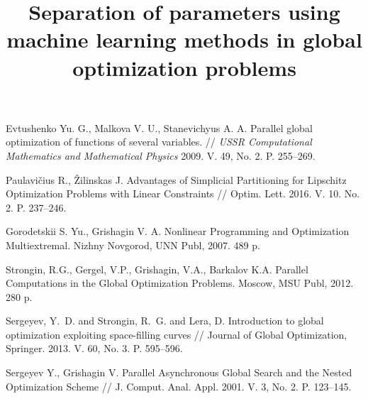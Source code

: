 \documentclass[11pt, oneside, a4paper]{article}
\begin{document}
\newpage

\title{Separation of parameters using machine learning methods in global optimization problems}




\begin{biblioen}

 Evtushenko Yu. G., Malkova V. U., Stanevichyus A. A. Parallel global optimization of functions of several variables. // {\it USSR Computational Mathematics and Mathematical Physics} 2009. V. 49, No. 2. P. 255--269.

 Paulavi{\v c}ius R., {\v Z}ilinskas J. Advantages of Simplicial Partitioning for Lipschitz Optimization Problems with Linear Constraints // Optim. Lett. 2016. V. 10. No. 2. P. 237--246.

 Gorodetskii S. Yu., Grishagin V. A. Nonlinear Programming and Optimization Multiextremal. Nizhny Novgorod, UNN Publ, 2007. 489 p.

 Strongin, R.G., Gergel, V.P., Grishagin, V.A., Barkalov K.A. Parallel Computations in the Global Optimization Problems. Moscow, MSU Publ, 2012. 280 p.

 Sergeyev, Y.~D. and Strongin, R.~G. and Lera, D. Introduction to global optimization exploiting space-filling curves // Journal of Global Optimization, Springer. 2013. V. 60, No. 3. P. 595--596.

 Sergeyev Y., Grishagin V. Parallel Asynchronous Global Search and the Nested Optimization Scheme // J. Comput. Anal. Appl. 2001. V. 3, No. 2. P. 123--145.

\end{biblioen}
\end{document}
